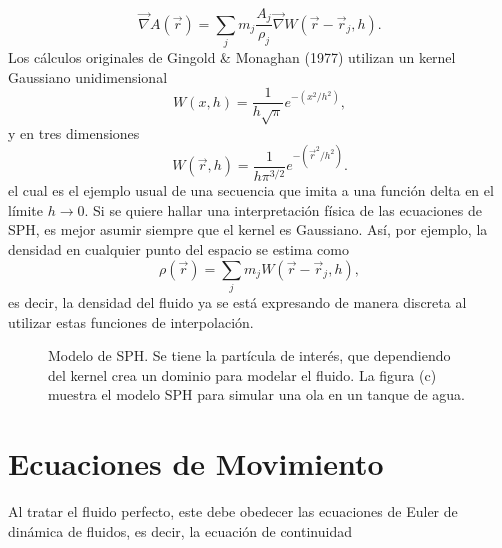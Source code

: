 \documentclass[a4paper,openright,12pt]{book}
\begin{document}
\begin{equation}
\vec{\nabla}A(\vec{r}) = 
\sum_{j} m_{j} \frac{A_{j}}{\rho_{j}} \vec{\nabla}W(\vec{r}-\vec{r}_{j}, h).\label{eqn 2.20}
\end{equation}
Los cálculos originales de Gingold \& Monaghan (1977) \cite{b9.1} utilizan un kernel Gaussiano unidimensional
\begin{equation}
  W(x,h)
  =
  \frac{1}{h \sqrt{\pi}} e^{-(x^{2}/h^{2})},\label{eqn2.21}
\end{equation}
y en tres dimensiones
\begin{equation}
W(\vec{r},h)
  =
  \frac{1}{h \pi^{3/2}} e^{-(\vec{r}^{2}/h^{2})}.\label{eqn 2.22}
\end{equation}
el cual es el ejemplo usual de una secuencia que imita a una función delta en el límite $h \rightarrow 0$. Si se quiere hallar una interpretación física de las ecuaciones de SPH, es mejor asumir siempre que el kernel es Gaussiano. Así, por ejemplo, la densidad en cualquier punto del espacio se estima como
\begin{equation}
\rho(\vec{r})
=
\sum_{j} m_{j} W (\vec{r}-\vec{r}_{j},h),\label{eqn 2.23}
\end{equation}
es decir, la densidad del fluido ya se está expresando de manera discreta al utilizar estas funciones de interpolación.
\begin{figure}
\centering
{}
\caption{\footnotesize{Modelo de SPH. Se tiene la partícula de interés, que dependiendo del kernel crea un dominio para modelar el fluido. La figura (c) muestra el modelo SPH para simular una ola en un tanque de agua.}} \label{fig 2.2}
\end{figure}
\section{Ecuaciones de Movimiento}
Al tratar el fluido perfecto, este debe obedecer las ecuaciones de Euler de dinámica de fluidos, es decir, la ecuación de continuidad
\end{document}
